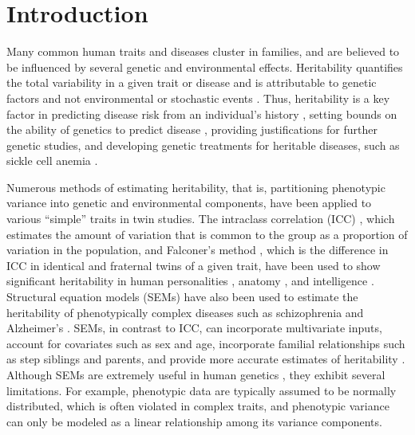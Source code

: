 \section{Introduction}
Many common human traits and diseases cluster in families, and are believed to be influenced by several genetic and environmental effects. Heritability quantifies the total variability in a given trait or disease and is attributable to genetic factors and not environmental or stochastic events \cite{tomasetti2015variation}. Thus, heritability is a key factor in predicting disease risk from an individual's history \cite{wray2010genetic}, setting bounds on the ability of genetics to predict disease \cite{wray2010genetic}, providing justifications for further genetic studies, and developing genetic treatments for heritable diseases, such as sickle cell anemia \cite{steinberg2012genetic, xu2021crispr, bennett2018gene, malik2020gene, lukacs2019gene}. 

Numerous methods of estimating heritability, that is, partitioning phenotypic variance into genetic and environmental components, have been applied to various ``simple'' traits in twin studies. The intraclass correlation (ICC) \cite{fisher1992statistical}, which estimates the amount of variation that is common to the group as a proportion of variation in the population, and Falconer's method \cite{falconer1996introduction}, which is the difference in ICC in identical and fraternal twins of a given trait, have been used to show significant heritability in human personalities \cite{gottesman1963heritability, floderus1980assessment, vukasovic2015heritability}, anatomy \cite{russell1998heritability, christian1989heritability, post1997heritability, michalowicz1991twin}, and intelligence \cite{eaves1972insignificance, vernon1989heritability}.
Structural equation models (SEMs) have also been used to estimate the heritability of phenotypically complex diseases such as schizophrenia and Alzheimer's \cite{cannon1998genetic, foote2021genetic}. SEMs, in contrast to ICC,  can incorporate multivariate inputs, account for covariates such as sex and age, incorporate familial relationships such as step siblings and parents, and provide more accurate estimates of heritability \cite{j2017assessing}. Although SEMs are extremely useful in human genetics \cite{neale2013methodology}, they exhibit several limitations. For example, phenotypic data are typically assumed to be normally distributed, which is often violated in complex traits, and phenotypic variance can only be modeled as a linear relationship among its variance components. 

